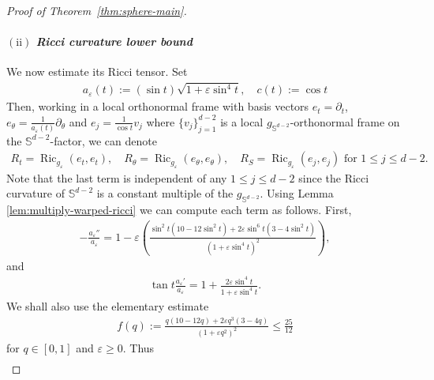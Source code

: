 \documentclass[11pt,reqno]{amsart}
\numberwithin{equation}{section}
\theoremstyle{definition}
\theoremstyle{remark}
\newcommand{\0}{\emptyset}
\newcommand{\veps}{\varepsilon}
\newcommand{\bbS}{\mathbb S}
\newcommand{\Ric}{\operatorname{Ric}}
\begin{document}
\begin{proof}[Proof of Theorem~\ref{thm:sphere-main}]
\paragraph{$\mathrm{(ii)}$ \textit{Ricci curvature lower bound}} We now estimate its Ricci tensor. Set 
\begin{align}
a_{\veps}(t):= (\sin t)\sqrt{1+\veps \sin^4 t},\quad c(t):=\cos t 
\end{align}
Then, working in a local orthonormal frame with basis vectors $e_t=\partial_t$, $e_\theta=\frac{1}{a_\veps(t)} \partial_\theta$ and $e_j=\frac{1}{\cos t} v_j$ where $\{v_j\}_{j=1}^{d-2}$ is a local $g_{\bbS^{d-2}}$-orthonormal frame on the $\bbS^{d-2}$-factor, we can denote 
\begin{align}
R_t=\Ric_{g_\veps}(e_t,e_t),\quad R_\theta=\Ric_{g_{\veps}}(e_\theta,e_\theta),\quad R_{S}=\Ric_{g_\veps}(e_j,e_j) \text{ for }1\leq j\leq d-2.
\end{align}
Note that the last term is independent of any $1\leq j\leq d-2$ since the Ricci curvature of $\bbS^{d-2}$ is a constant multiple of the $g_{\bbS^{d-2}}.$ Using Lemma \ref{lem:multiply-warped-ricci} we can compute each term as follows. First,
\begin{align}
        -\frac{a_\veps''}{a_\veps}
        =
        1-\veps\left(\frac{\sin^2 t(10-12\sin^2 t)+2\veps \sin^6 t (3-4\sin^2 t)}{(1+\veps \sin^4 t)^2}\right),
\end{align}
and
\begin{align}\label{eq:tan-a-prime-over-a}
        \tan t\frac{a_\veps'}{a_\veps}
        =
        1+
        \frac{2\veps \sin^4t}{1+\veps\sin^4t}.
\end{align}
We shall also use the elementary estimate
\begin{align}\label{eq:ricci-elementary-bound}
        f(q):=
        \frac{q (10-12q )+2\veps q^3  (3-4q )}{(1+\veps q^2)^2}
        \leq \frac{25}{12}
\end{align}
for $q\in [0,1]$ and $\veps\geq0$. 
Thus
\begin{align}

\end{align}
\end{proof}
\end{document}

